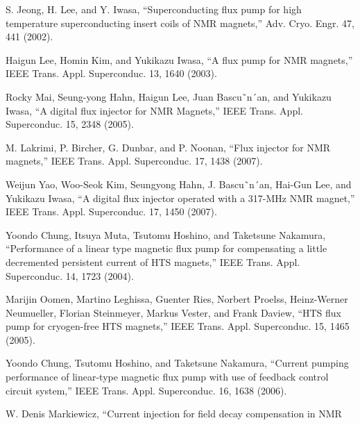 \noindent [7.117] S. Jeong, H. Lee, and Y. Iwasa, ``Superconducting flux pump for high temperature superconducting insert coils of NMR magnets,” 
Adv. Cryo. Engr. 47, 441 (2002).

\noindent [7.118] Haigun Lee, Homin Kim, and Yukikazu Iwasa, ``A flux pump for NMR magnets,” IEEE Trans. Appl. Superconduc. 13, 1640 (2003).

\noindent [7.119] Rocky Mai, Seung-yong Hahn, Haigun Lee, Juan Bascu˜n´an, and Yukikazu Iwasa, ``A digital flux injector for NMR Magnets,” 
IEEE Trans. Appl. Superconduc. 15, 2348 (2005).

\noindent [7.120] M. Lakrimi, P. Bircher, G. Dunbar, and P. Noonan, ``Flux injector for NMR magnets,” IEEE Trans. Appl. Superconduc. 17, 1438 (2007).

\noindent [7.121] Weijun Yao, Woo-Seok Kim, Seungyong Hahn, J. Bascu˜n´an, Hai-Gun Lee, and Yukikazu Iwasa,
 ``A digital flux injector operated with a 317-MHz NMR magnet,” IEEE Trans. Appl. Superconduc. 17, 1450 (2007).

\noindent [7.122] Yoondo Chung, Itsuya Muta, Tsutomu Hoshino, and Taketsune Nakamura, ``Performance
of a linear type magnetic flux pump for compensating a little decremented
persistent current of HTS magnets,” IEEE Trans. Appl. Superconduc.
14, 1723 (2004).

\noindent [7.123] Marijin Oomen, Martino Leghissa, Guenter Ries, Norbert Proelss, Heinz-Werner Neumueller, Florian Steinmeyer, Markus Vester, and Frank Daview, 
``HTS flux pump for cryogen-free HTS magnets,” IEEE Trans. Appl. Superconduc. 15, 1465 (2005).

\noindent [7.124] Yoondo Chung, Tsutomu Hoshino, and Taketsune Nakamura, 
``Current pumping performance of linear-type magnetic flux pump with use of feedback control circuit system,” IEEE Trans. Appl. Superconduc. 16, 1638 (2006).

\noindent [7.125] W. Denis Markiewicz, ``Current injection for field decay compensation in NMR
